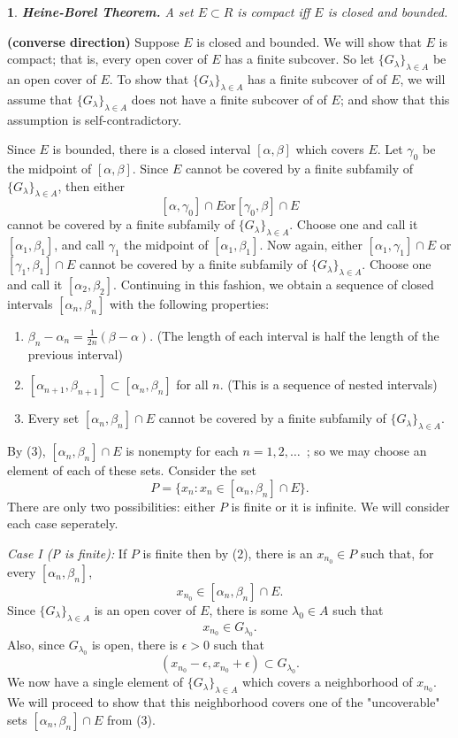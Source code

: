 \documentclass[11pt]{article}
\makeatletter
\renewenvironment{proof}{{\bfseries Proof}}{\qed}
\renewenvironment{proof}[1][\bfseries \proofname]{\par
  \pushQED{\qed}%
  \normalfont \topsep6\p@\@plus6\p@\relax
  \trivlist
  \item[\hskip\labelsep
        \scshape
    #1\@addpunct{}]\ignorespaces
}{%
  \popQED\endtrivlist\@endpefalse
}
\newtheorem{theorem}{}
\newcommand{\glambda}{\{G_\lambda\}_{\lambda \in A}}
\makeatother
\begin{document}
	
\begin{theorem} 
\textbf{Heine-Borel Theorem.} A set $E \subset R$ is compact iff $E$ is closed and bounded.
\end{theorem}

\begin{proof} \textbf{(converse direction)}
Suppose $E$ is closed and bounded. We will show that $E$ is compact; that is, every open cover of $E$ has a finite subcover. So let $\glambda$ be an open cover of $E$. To show that $\glambda$ has a finite subcover of of $E$, we will assume that $\glambda$ does not have a finite subcover of of $E$; and show that this assumption is self-contradictory. 

Since $E$ is bounded, there is a closed interval $[\alpha, \beta]$ which covers $E$. Let $\gamma_0$ be the midpoint of $[\alpha, \beta]$. Since $E$ cannot be covered by a finite subfamily of $\glambda$, then either $$[\alpha, \gamma_0] \cap E \text{or} [\gamma_0, \beta] \cap E$$ cannot be covered by a finite subfamily of $\glambda$. Choose one and call it $[\alpha_1, \beta_1]$, and call $\gamma_1$ the midpoint of $[\alpha_1, \beta_1]$. Now again, either $[\alpha_1, \gamma_1] \cap E$ or $[\gamma_1, \beta_1] \cap E$ cannot be covered by a finite subfamily of $\glambda$. Choose one and call it $[\alpha_2, \beta_2]$. Continuing in this fashion, we obtain a sequence of closed intervals $[\alpha_n, \beta_n]$ with the following properties:
\begin{enumerate}
	\item $\beta_n - \alpha_n = \frac{1}{2n}(\beta - \alpha)$. (The length of each interval is half the length of the previous interval)
	\item $[\alpha_{n+1}, \beta_{n+1}] \subset [\alpha_{n}, \beta_{n}]$ for all $n$. (This is a sequence of nested intervals)
	\item Every set $[\alpha_{n}, \beta_{n}] \cap E$ cannot be covered by a finite subfamily of $\glambda$.
\end{enumerate}
By (3), $[\alpha_{n}, \beta_{n}] \cap E$  is nonempty for each $n = 1,2, \ldots \,$ ; so we may choose an element of each of these sets. Consider the set $$P = \{x_n: x_n \in [\alpha_{n}, \beta_{n}] \cap E \}.$$
There are only two possibilities: either $P$ is finite or it is infinite. We will consider each case seperately.

\textit{Case I (P is finite):} If $P$ is finite then by (2), there is an $x_{n_0} \in P$ such that, for every $[\alpha_{n}, \beta_{n}]$, 
$$ x_{n_0} \in [\alpha_{n}, \beta_{n}] \cap E.$$
Since $\glambda$ is an open cover of $E$, there is some $\lambda_0 \in A$ such that 
$$ x_{n_0} \in G_{\lambda_0}.$$
Also, since $G_{\lambda_0}$ is open, there is $\epsilon > 0$ such that 
$$(x_{n_0} - \epsilon, x_{n_0} + \epsilon) \subset G_{\lambda_0}.$$
We now have a single element of $\glambda$ which covers a neighborhood of $x_{n_0}$. We will proceed to show that this neighborhood covers one of the "uncoverable" sets $[\alpha_{n}, \beta_{n}] \cap E$ from (3).


\end{proof}
\end{document}
